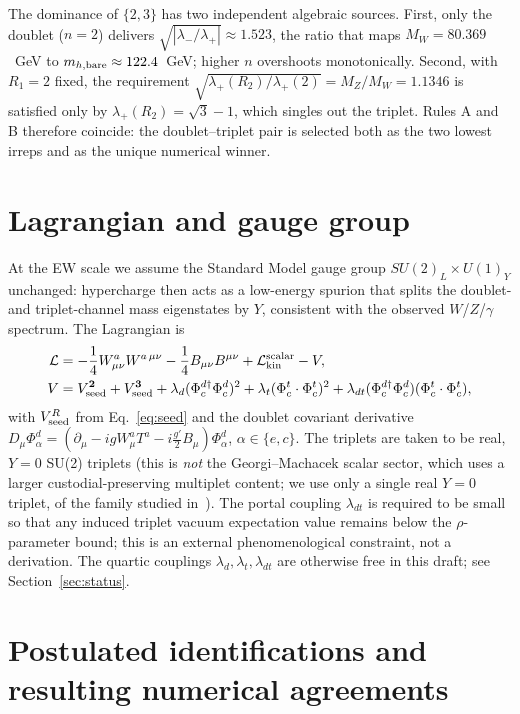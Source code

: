 \documentclass[11pt,a4paper]{article}
\newcommand{\md}{\mathbf{2}}
\newcommand{\mt}{\mathbf{3}}
\begin{document}
The dominance of $\{2,3\}$ has two independent algebraic sources.
First, only the doublet ($n = 2$) delivers
$\sqrt{|\lambda_-/\lambda_+|} \approx 1.523$, the ratio that maps
$M_W = 80.369$~GeV to $m_{h,{\rm bare}} \approx 122.4$~GeV; higher $n$
overshoots monotonically. Second, with $R_1 = 2$ fixed, the requirement
$\sqrt{\lambda_+(R_2) / \lambda_+(2)} = M_Z / M_W = 1.1346$ is satisfied
only by $\lambda_+(R_2) = \sqrt{3} - 1$, which singles out the triplet.
Rules A and B therefore coincide: the doublet--triplet pair is selected
both as the two lowest irreps and as the unique numerical winner.

\section{Lagrangian and gauge group}

At the EW scale we assume the Standard Model gauge group $SU(2)_L \times
U(1)_Y$ unchanged: hypercharge then acts as a low-energy spurion that
splits the doublet- and triplet-channel mass eigenstates by $Y$,
consistent with the observed $W$/$Z$/$\gamma$ spectrum. The Lagrangian is
\begin{align}
  \mathcal L &= -\frac14 W^a_{\mu\nu}W^{a\,\mu\nu} - \frac14 B_{\mu\nu}B^{\mu\nu}
  + \mathcal L_{\rm kin}^{\rm scalar} - V,\\
  V &= V_{\rm seed}^{\md} + V_{\rm seed}^{\mt}
       + \lambda_d (\Phi^{d\dagger}_c \Phi^d_c)^2
       + \lambda_t (\Phi^t_c \cdot \Phi^t_c)^2
       + \lambda_{dt} (\Phi^{d\dagger}_c \Phi^d_c)(\Phi^t_c \cdot \Phi^t_c),
\end{align}
with $V_{\rm seed}^R$ from Eq.~\eqref{eq:seed} and the doublet covariant
derivative
\(D_\mu \Phi^{d}_\alpha = (\partial_\mu - i g W^a_\mu T^a - i\tfrac{g'}{2} B_\mu)\Phi^{d}_\alpha\),
$\alpha \in \{e, c\}$. The triplets are taken to be real, $Y = 0$ SU(2)
triplets (this is \emph{not} the Georgi--Machacek scalar sector, which
uses a larger custodial-preserving multiplet content; we use only a
single real $Y=0$ triplet, of the family studied
in~\cite{Cirelli2006, FischerVanDerBij2014, Khan2018Triplet, Katayose2021TripletDM}). The portal coupling $\lambda_{dt}$ is
required to be small so that any induced triplet vacuum expectation
value remains below the $\rho$-parameter bound; this is an external
phenomenological constraint, not a derivation. The quartic couplings
$\lambda_d, \lambda_t, \lambda_{dt}$ are otherwise free in this draft;
see Section~\ref{sec:status}.

\section{Postulated identifications and resulting numerical agreements}
\label{sec:postulates}
\end{document}

